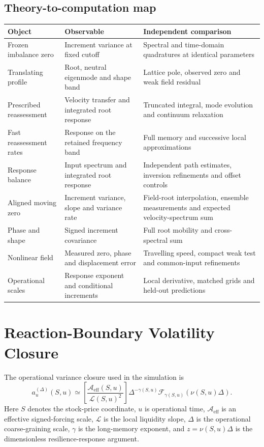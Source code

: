 \documentclass[11pt]{article}
\newcommand{\Aeff}{\mathcal A_{\mathrm{eff}}}
\newcommand{\Liq}{\mathcal L}
\newcommand{\Fresp}{\mathcal F}
\begin{document}
\subsection{Theory-to-computation map}
\begin{center}
\small
\begin{tabular}{p{.23\linewidth}p{.31\linewidth}p{.36\linewidth}}
\toprule
Object & Observable & Independent comparison \\
\midrule
Frozen imbalance zero & Increment variance at fixed cutoff & Spectral and time-domain quadratures at identical parameters \\
Translating profile & Root, neutral eigenmode and shape band & Lattice pole, observed zero and weak field residual \\
Prescribed reassessment & Velocity transfer and integrated root response & Truncated integral, mode evolution and continuum relaxation \\
Fast reassessment rates & Response on the retained frequency band & Full memory and successive local approximations \\
Response balance & Input spectrum and integrated root response & Independent path estimates, inversion refinements and offset controls \\
Aligned moving zero & Increment variance, slope and variance rate & Field-root interpolation, ensemble measurements and expected velocity-spectrum sum \\
Phase and shape & Signed increment covariance & Full root mobility and cross-spectral sum \\
Nonlinear field & Measured zero, phase and displacement error & Travelling speed, compact weak test and common-input refinements \\
Operational scales & Response exponent and conditional increments & Local derivative, matched grids and held-out predictions \\
\bottomrule
\end{tabular}
\end{center}

\section{Reaction-Boundary Volatility Closure}

The operational variance closure used in the simulation is
\begin{equation}
 a_u^{(\Delta)}(S,u)
 \simeq
 \left[
 \frac{\Aeff(S,u)}
      {\Liq(S,u)^2}
 \right]
 \Delta^{-\gamma(S,u)}
 \Fresp_{\gamma(S,u)}\!\left(\nu(S,u)\Delta\right).
 \label{eq:operational-closure}
\end{equation}
Here \(S\) denotes the stock-price coordinate, \(u\) is operational time,
\(\Aeff\) is an effective signed-forcing scale, \(\Liq\) is the local
liquidity slope, \(\Delta\) is the operational coarse-graining scale,
\(\gamma\) is the long-memory exponent, and
\(z=\nu(S,u)\Delta\) is the dimensionless resilience-response argument.
\end{document}
